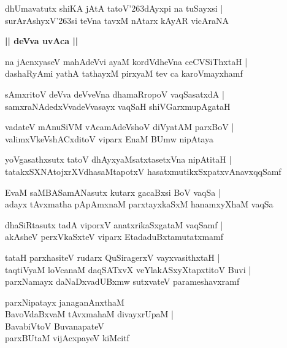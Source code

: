 \documentclass[twoside,12pt,openright]{book}
\def\S{\char'263}
\newcounter{shloka}[chapter]
\def\uvaca#1{\centerline{{\large\textbf{#1}}}}
\begin{document}
\begin{shloka}
dhUmavatutx shiKA jAtA tatoV\S dAyxpi na tuSayxsi |\\
surArAshyxV\S si teVna tavxM nAtarx kAyAR vicAraNA
\end{shloka}

\uvaca{|| deVva uvAca ||}

\begin{shloka}
na jAcnxyaseV mahAdeVvi ayaM kordVdheVna ceCVSiThxtaH |\\
dashaRyAmi yathA tathayxM pirxyaM tev ca karoVmayxhamf
\end{shloka}


\begin{shloka}
sAmxritoV deVva deVveVna dhamaRropoV vaqSasatxdA |\\
samxraNAdedxVvadeVvasayx vaqSaH shiVGarxmupAgataH 
\end{shloka}

\begin{shloka}
vadateV mAnuSiVM vAcamAdeVshoV diVyatAM parxBoV |\\
valimxVkeVshACxditoV viparx EnaM BUmw nipAtaya
\end{shloka}

\begin{shloka}
yoVgasathxsutx tatoV dhAyxyaMsatxtasetxVna nipAtitaH |\\
tatakxSXNAtojxrXVdhasaMtapotxV hasatxmutikxSxpatxvAnavxqqSamf 
\end{shloka}

\begin{shloka}
EvaM saMBASamANasutx kutarx gacaBxsi BoV vaqSa |\\
adayx tAvxmatha pApAmxnaM parxtayxkaSxM hanamxyXhaM vaqSa
\end{shloka}

\begin{shloka}
dhaSiRtasutx tadA viporxV anatxrikaSxgataM vaqSamf |\\
akAsheV perxVkaSxteV viparx EtadaduBxtamutatxmamf 
\end{shloka}

\begin{shloka}
tataH parxhasiteV rudarx QuSiragerxV vayxvasithxtaH |\\
taqtiVyaM loVcanaM daqSATxvX veYlakASxyXtapxtitoV Buvi |\\
parxNamayx daNaDxvadUBxmw sutxvateV parameshavxramf
\end{shloka}

\begin{shloka}
parxNipatayx janaganAnxthaM \\
BavoVdaBxvaM tAvxmahaM divayxrUpaM |\\
BavabiVtoV BuvanapateV \\
parxBUtaM vijAcxpayeV kiMcitf
\end{shloka}
\end{document}
